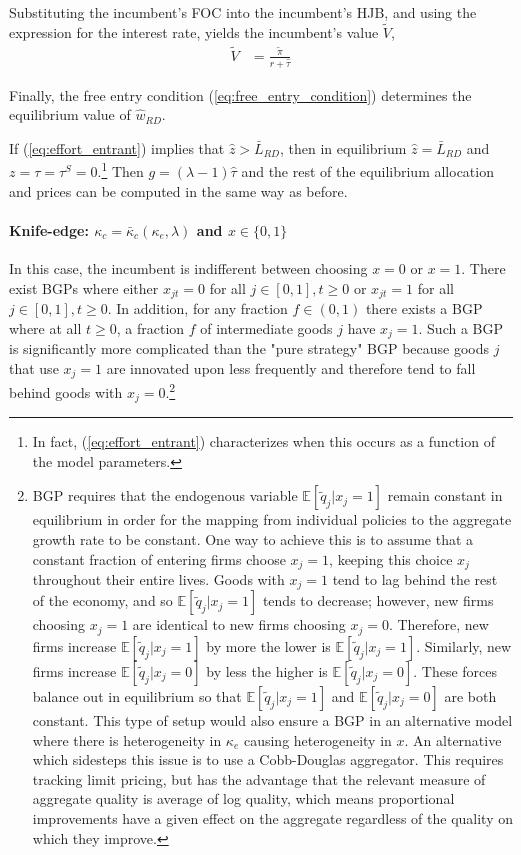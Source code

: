 \documentclass[11pt,english]{article}
\begin{document}
Substituting the incumbent's FOC into the incumbent's HJB, and using the expression for the interest rate, yields the incumbent's value $\tilde{V}$,
\begin{align}
	 \tilde{V} &= \frac{\tilde{\pi}}{r + \hat{\tau}} \label{eq:hjb_incumbent_gordon_formula}
\end{align}

Finally, the free entry condition (\ref{eq:free_entry_condition}) determines the equilibrium value of $\hat{w}_{RD}$.

If (\ref{eq:effort_entrant}) implies that $\hat{z} > \bar{L}_{RD}$, then in equilibrium $\hat{z} = \bar{L}_{RD}$ and $z = \tau = \tau^S = 0$.\footnote{In fact, (\ref{eq:effort_entrant}) characterizes when this occurs as a function of the model parameters.} Then $g = (\lambda - 1) \hat{\tau}$ and the rest of the equilibrium allocation and prices can be computed in the same way as before. 

\paragraph{Knife-edge: $\kappa_c = \bar{\kappa}_c(\kappa_e,\lambda)$ and $x \in \{0,1\}$}

In this case, the incumbent is indifferent between choosing $x = 0$ or $x = 1$. There exist BGPs where either $x_{jt} = 0$ for all $j\in[0,1],t \ge 0$ or $x_{jt} = 1$ for all $j\in[0,1],t \ge 0$. In addition, for any fraction $f \in (0,1)$ there exists a BGP where at all $t \ge 0$, a fraction $f$ of intermediate goods $j$ have $x_j = 1$. Such a BGP is significantly more complicated than the "pure strategy" BGP because goods $j$ that use $x_j = 1$ are innovated upon less frequently and therefore tend to fall behind goods with $x_j = 0$.\footnote{BGP requires that the endogenous variable $\mathbb{E}[\tilde{q}_j | x_j = 1]$ remain constant in equilibrium in order for the mapping from individual policies to the aggregate growth rate to be constant. One way to achieve this is to assume that a constant fraction of entering firms choose $x_j = 1$, keeping this choice $x_j$ throughout their entire lives. Goods with $x_j = 1$ tend to lag behind the rest of the economy, and so $\mathbb{E}[\tilde{q}_j| x_j = 1]$ tends to decrease; however, new firms choosing $x_j = 1$ are identical to new firms choosing $x_j = 0$. Therefore, new firms increase $\mathbb{E}[\tilde{q}_j | x_j = 1]$ by more the lower is $\mathbb{E}[\tilde{q}_j | x_j = 1]$. Similarly, new firms increase  $\mathbb{E}[\tilde{q}_j | x_j = 0]$ by less the higher is $\mathbb{E}[\tilde{q}_j | x_j = 0]$. These forces balance out in equilibrium so that $\mathbb{E}[\tilde{q}_j | x_j = 1]$ and $\mathbb{E}[\tilde{q}_j | x_j = 0]$ are both constant. This type of setup would also ensure a BGP in an alternative model where there is heterogeneity in $\kappa_e$ causing heterogeneity in $x$. An alternative which sidesteps this issue is to use a Cobb-Douglas aggregator. This requires tracking limit pricing, but has the advantage that the relevant measure of aggregate quality is average of log quality, which means proportional improvements have a given effect on the aggregate regardless of the quality on which they improve.}
\end{document}
